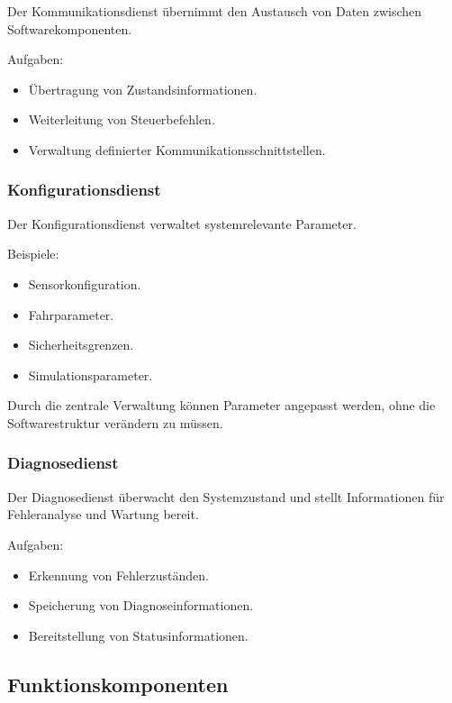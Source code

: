 \documentclass[
  a4paper,
  12pt,
  DIV=12,        %
  parskip=half,  %
  headings=small %
]{scrartcl}
\theoremstyle{definition}
\providecommand{\tightlist}{%
  \setlength{\itemsep}{0pt}\setlength{\parskip}{0pt}}
\theoremstyle{definition}
\begin{document}
Der Kommunikationsdienst übernimmt den Austausch von Daten zwischen
Softwarekomponenten.

Aufgaben:

\begin{itemize}
\tightlist
\item
  Übertragung von Zustandsinformationen.
\item
  Weiterleitung von Steuerbefehlen.
\item
  Verwaltung definierter Kommunikationsschnittstellen.
\end{itemize}

\subsubsection{Konfigurationsdienst}\label{konfigurationsdienst}

Der Konfigurationsdienst verwaltet systemrelevante Parameter.

Beispiele:

\begin{itemize}
\tightlist
\item
  Sensorkonfiguration.
\item
  Fahrparameter.
\item
  Sicherheitsgrenzen.
\item
  Simulationsparameter.
\end{itemize}

Durch die zentrale Verwaltung können Parameter angepasst werden, ohne
die Softwarestruktur verändern zu müssen.

\subsubsection{Diagnosedienst}\label{diagnosedienst}

Der Diagnosedienst überwacht den Systemzustand und stellt Informationen
für Fehleranalyse und Wartung bereit.

Aufgaben:

\begin{itemize}
\tightlist
\item
  Erkennung von Fehlerzuständen.
\item
  Speicherung von Diagnoseinformationen.
\item
  Bereitstellung von Statusinformationen.
\end{itemize}

\subsection{Funktionskomponenten}\label{funktionskomponenten}
\end{document}
